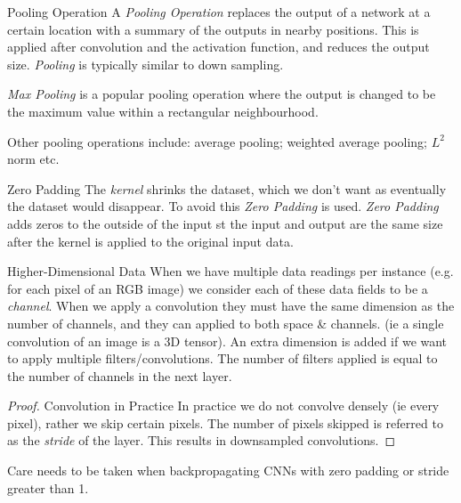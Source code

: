 \documentclass[11pt,a4paper]{article}
\begin{document}
    \begin{definition}{Pooling Operation}
      A \textit{Pooling Operation} replaces the output of a network at a certain location with a summary of the outputs in nearby positions. This is applied after convolution and the activation function, and reduces the output size. \textit{Pooling} is typically similar to down sampling.
      \par \textit{Max Pooling} is a popular pooling operation where the output is changed to be the maximum value within a rectangular neighbourhood.
      \par Other pooling operations include: average pooling; weighted average pooling; $L^2$ norm etc.
    \end{definition}

    \begin{proposition}{Zero Padding}
      The \textit{kernel} shrinks the dataset, which we don't want as eventually the dataset would disappear. To avoid this \textit{Zero Padding} is used. \textit{Zero Padding} adds zeros to the outside of the input st the input and output are the same size after the kernel is applied to the original input data.
    \end{proposition}

    \begin{proposition}{Higher-Dimensional Data}
      When we have multiple data readings per instance (e.g. for each pixel of an RGB image) we consider each of these data fields to be a \textit{channel}. When we apply a convolution they must have the same dimension as the number of channels, and they can applied to both space \& channels. (ie a single convolution of an image is a 3D tensor). An extra dimension is added if we want to apply multiple filters/convolutions. The number of filters applied is equal to the number of channels in the next layer.
    \end{proposition}

    \begin{proof}{Convolution in Practice}
      In practice we do not convolve densely (ie every pixel), rather we skip certain pixels. The number of pixels skipped is referred to as the \textit{stride} of the layer. This results in downsampled convolutions.
    \end{proof}

    \begin{remark}{Care needs to be taken when backpropagating CNNs with zero padding or stride greater than 1.}\end{remark}
\end{document}
